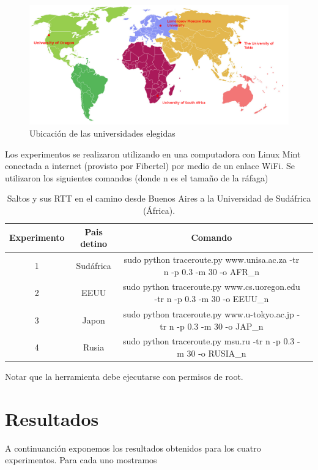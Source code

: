  
\begin{figure}[H]
  \centering
  \includegraphics[scale = 0.3]{imagenes/mapa.png}
  \caption{Ubicación de las universidades elegidas}
  \label{histogramaprobabilidadesModel1}
\end{figure}


Los experimentos se realizaron utilizando en una computadora con Linux Mint conectada a internet (provisto por Fibertel) por medio de un enlace WiFi. Se utilizaron los siguientes comandos (donde n es el tamaño de la ráfaga) 
\begin{table}[]
\centering
\caption{Saltos y sus RTT en el camino desde Buenos Aires a la Universidad de Sudáfrica (África).}
\begin{tabular}{ | c | c | c | c | }
	\hline 
Experimento & Pais detino& Comando\\ \hline
 1 & Sudáfrica & sudo python traceroute.py www.unisa.ac.za -tr n -p 0.3 -m 30 -o AFR\_n \\ 
  2 & EEUU& sudo python traceroute.py www.cs.uoregon.edu -tr n -p 0.3 -m 30 -o EEUU\_n \\ 
  3 & Japon& sudo python traceroute.py www.u-tokyo.ac.jp -tr n -p 0.3 -m 30 -o JAP\_n \\ 
  4 & Rusia & sudo python traceroute.py msu.ru -tr n -p 0.3 -m 30 -o RUSIA\_n \\ 
  \hline

\end{tabular}
\end{table}
  Notar que la herramienta debe ejecutarse con permisos de root.
  
\section{Resultados}

A continuanción exponemos los resultados obtenidos para los cuatro experimentos. 
Para cada uno mostramos 

